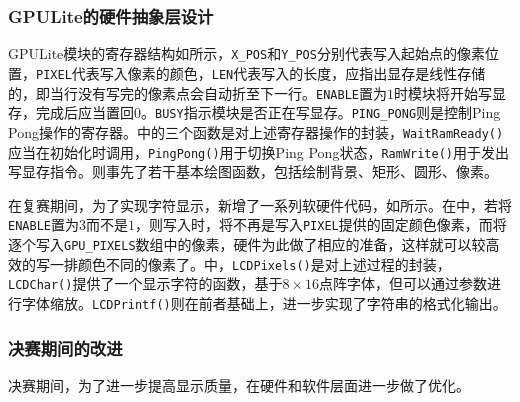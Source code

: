 \subsubsection{GPULite的硬件抽象层设计}

GPULite模块的寄存器结构如所示，\texttt{X\_POS}和\texttt{Y\_POS}分别代表写入起始点的像素位置，\texttt{PIXEL}代表写入像素的颜色，\texttt{LEN}代表写入的长度，应指出显存是线性存储的，即当行没有写完的像素点会自动折至下一行。\texttt{ENABLE}置为$1$时模块将开始写显存，完成后应当置回$0$。\texttt{BUSY}指示模块是否正在写显存。\texttt{PING\_PONG}则是控制Ping Pong操作的寄存器。中的三个函数是对上述寄存器操作的封装，\texttt{WaitRamReady()}应当在初始化时调用，\texttt{PingPong()}用于切换Ping Pong状态，\texttt{RamWrite()}用于发出写显存指令。则事先了若干基本绘图函数，包括绘制背景、矩形、圆形、像素。






在复赛期间，为了实现字符显示，新增了一系列软硬件代码，如所示。在中，若将\texttt{ENABLE}置为$3$而不是$1$，则写入时，将不再是写入\texttt{PIXEL}提供的固定颜色像素，而将逐个写入\texttt{GPU\_PIXELS}数组中的像素，硬件为此做了相应的准备，这样就可以较高效的写一排颜色不同的像素了。中，\texttt{LCDPixels()}是对上述过程的封装，\texttt{LCDChar()}提供了一个显示字符的函数，基于$8\times 16$点阵字体，但可以通过参数进行字体缩放。\texttt{LCDPrintf()}则在前者基础上，进一步实现了字符串的格式化输出。



\subsubsection{决赛期间的改进}
决赛期间，为了进一步提高显示质量，在硬件和软件层面进一步做了优化。

